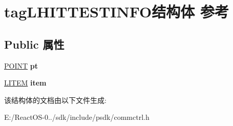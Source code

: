 \hypertarget{structtag_l_h_i_t_t_e_s_t_i_n_f_o}{}\section{tag\+L\+H\+I\+T\+T\+E\+S\+T\+I\+N\+F\+O结构体 参考}
\label{structtag_l_h_i_t_t_e_s_t_i_n_f_o}
\subsection*{Public 属性}
\begin{DoxyCompactItemize}
\item 
\mbox{\label{structtag_l_h_i_t_t_e_s_t_i_n_f_o_a87272727589c03eb6ff0c569b1d4c90b}} 
\hyperlink{structtag_p_o_i_n_t}{P\+O\+I\+NT} {\bfseries pt}
\item 
\mbox{\label{structtag_l_h_i_t_t_e_s_t_i_n_f_o_a749440a6b560bbbdb4ba96f7e3fd5c01}} 
\hyperlink{structtag_l_i_t_e_m}{L\+I\+T\+EM} {\bfseries item}
\end{DoxyCompactItemize}


该结构体的文档由以下文件生成\+:\begin{DoxyCompactItemize}
\item 
E\+:/\+React\+O\+S-\/0../sdk/include/psdk/commctrl.\+h\end{DoxyCompactItemize}
